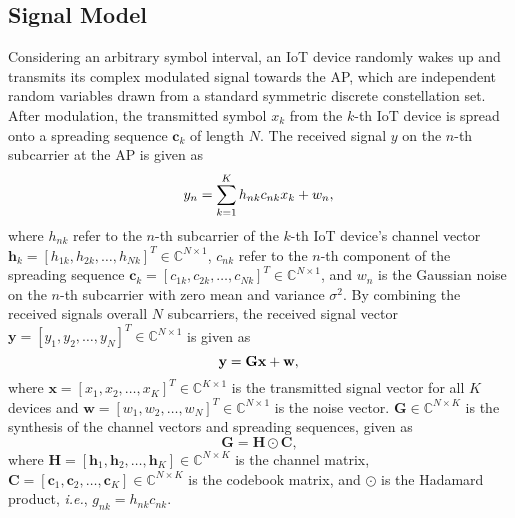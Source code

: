 \documentclass[journal,10pt]{IEEEtran}
\begin{document}
\subsection{Signal Model}
Considering an arbitrary symbol interval, an IoT device randomly wakes up and transmits its complex modulated signal towards the AP, which are independent random variables drawn from a standard symmetric discrete constellation set. After modulation, the transmitted symbol $x_k$ from the $k$-th IoT device is spread onto a spreading sequence $\mathbf{c}_k$ of length $N$. The received signal $y$ on the $n$-th subcarrier at the AP is given as 
\begin{equation} \label{eqmain1}
        y_n  =	\sum_{k=1}^{K} h_{nk}  c_{nk} x_k   +   w_n,\\
\end{equation}
where $h_{nk}$ refer to the $n$-th subcarrier of the $k$-th IoT device's channel vector $\mathbf{h}_k = \left[  h_{1k}, h_{2k}, \hdots, h_{Nk} \right]^T \in \mathbb{C}^{N \times 1}$, $c_{nk}$ refer to the $n$-th component of the spreading sequence $\mathbf{c}_k = \left[  c_{1k}, c_{2k}, \hdots, c_{Nk} \right]^T \in \mathbb{C}^{N \times 1}$, and $w_n$ is the Gaussian noise on the $n$-th subcarrier with zero mean and variance $\sigma^2$. By combining the received signals overall $N$ subcarriers, the received signal vector $\mathbf{y} = [y_1, y_2, \hdots, y_N ]^T \in \mathbb{C}^{N \times 1}$ is given as
\begin{equation} \label{eqmain2}
        \mathbf{y}  =	\mathbf{G x + w},\\
\end{equation}
where $\mathbf{x} = [x_1, x_2, \hdots, x_K]^T \in \mathbb{C}^{K \times 1}$ is the transmitted signal vector for all $K$ devices and $\mathbf{w} = \left[  w_{1}, w_{2}, \hdots, w_{N} \right]^T \in \mathbb{C}^{N \times 1}$ is the noise vector. $\mathbf{G} \in \mathbb{C}^{N \times K}$ is the synthesis of the channel vectors and spreading sequences, given as
\begin{equation}\label{CodeBookwa}
    \mathbf{G} = \mathbf{H} \odot \mathbf{C},
\end{equation}
where $\mathbf{H} = [\mathbf{h}_1, \mathbf{h}_2, \hdots, \mathbf{h}_K] \in \mathbb{C}^{N \times K}$ is the channel matrix, $\mathbf{C} = [\mathbf{c}_1, \mathbf{c}_2, \hdots, \mathbf{c}_K] \in \mathbb{C}^{N \times K}$ is the codebook matrix, and $\odot$ is the Hadamard product, \emph{i.e.}, $g_{nk} = h_{nk} c_{nk}$. 
\end{document}
